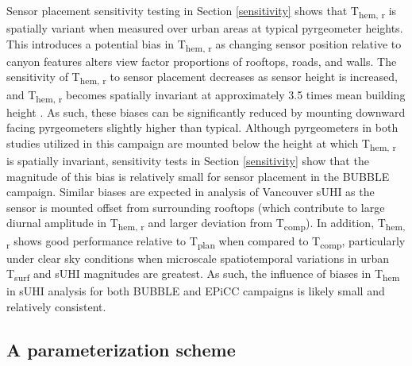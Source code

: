\begin{bibunit}
Sensor placement sensitivity testing in Section \ref{sensitivity} shows that T\textsubscript{hem, r} is spatially variant when measured over urban areas at typical pyrgeometer heights. This introduces a potential bias in T\textsubscript{hem, r} as changing sensor position relative to canyon features alters view factor proportions of rooftops, roads, and walls. The sensitivity of T\textsubscript{hem, r} to sensor placement decreases as sensor height is increased, and T\textsubscript{hem, r} becomes spatially invariant at approximately 3.5 times mean building height \citep{Roberts2010,Adderley2015}. As such, these biases can be significantly reduced by mounting downward facing pyrgeometers slightly higher than typical. Although pyrgeometers in both studies utilized in this campaign are mounted below the height at which T\textsubscript{hem, r} is spatially invariant, sensitivity tests in Section \ref{sensitivity} show that the magnitude of this bias is relatively small for sensor placement in the BUBBLE campaign. Similar biases are expected in analysis of Vancouver sUHI as the sensor is mounted offset from surrounding rooftops (which contribute to large diurnal amplitude in T\textsubscript{hem, r} and larger deviation from T\textsubscript{comp}). In addition, T\textsubscript{hem, r} shows good performance relative to T\textsubscript{plan} when compared to T\textsubscript{comp}, particularly under clear sky conditions when microscale spatiotemporal variations in urban T\textsubscript{surf} and sUHI magnitudes are greatest. As such, the influence of biases in T\textsubscript{hem} in sUHI analysis for both BUBBLE and EPiCC campaigns is likely small and relatively consistent.

\subsection{A parameterization scheme}


\end{bibunit}
